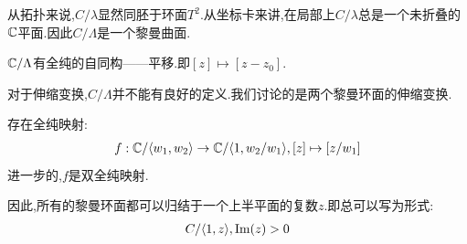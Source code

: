 从拓扑来说,$C/\lambda$显然同胚于环面$T^2$.从坐标卡来讲,在局部上$C/\lambda$总是一个未折叠的$\mathbb{C}$平面.因此$C/\Lambda$是一个黎曼曲面.

\begin{proposition}
	$\mathbb{C}/\Lambda$有全纯的自同构——平移.即$[z]\mapsto [z-z_0]$.
\end{proposition}
对于伸缩变换,$C/\Lambda$并不能有良好的定义.我们讨论的是两个黎曼环面的伸缩变换.
\begin{proposition}
	存在全纯映射:
	\begin{align*}
		f:\mathbb{C}/\langle w_1,w_2\rangle \to \mathbb{C}/\langle 1,w_2/w_1\rangle,[z]\mapsto [z/w_1]
	\end{align*}
    进一步的,$f$是双全纯映射.
\end{proposition}
因此,所有的黎曼环面都可以归结于一个上半平面的复数$z$.即总可以写为形式:
\begin{align*}
	C/\langle 1,z\rangle, \mathrm{Im}(z)>0
\end{align*}

